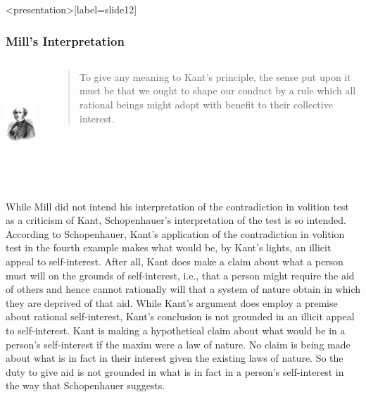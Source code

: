 \begin{frame}<presentation>[label=slide12]
    \frametitle{Mill's Interpretation}
        \begin{columns}
            \begin{column}{3cm}
                \includegraphics[height=4cm]{../../graphics/mill.jpg}
            \end{column}
            \begin{column}{7cm}
                \begin{quote}
                    To give any meaning to Kant's principle, the sense put upon it must be that we ought to shape our conduct by a rule which all rational beings might adopt \alert{with benefit to their collective interest}.
                \end{quote}
            \end{column}
        \end{columns}
\end{frame}

While Mill did not intend his interpretation of the contradiction in volition test as a criticism of Kant, Schopenhauer's interpretation of the test is so intended. According to Schopenhauer, Kant's application of the contradiction in volition test in the fourth example makes what would be, by Kant's lights, an illicit appeal to self-interest. After all, Kant does make a claim about what a person must will on the grounds of self-interest, i.e., that a person might require the aid of others and hence cannot rationally will that a system of nature obtain in which they are deprived of that aid. While Kant's argument does employ a premise about rational self-interest, Kant's conclusion is not grounded in an illicit appeal to self-interest. Kant is making a hypothetical claim about what would be in a person's self-interest if the maxim were a law of nature. No claim is being made about what is in fact in their interest given the existing laws of nature. So the duty to give aid is not grounded in what is in fact in a person's self-interest in the way that Schopenhauer suggests. \change


